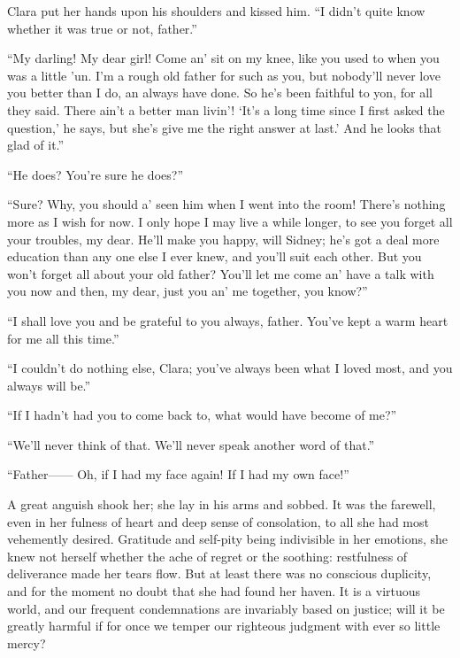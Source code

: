 Clara put her hands upon his shoulders and kissed him. ``I didn't quite
know whether it was true or not, father.''

``My darling! My dear girl! Come an' sit on my knee, like you used to
when you was a little 'un. I'm a rough old father for such as you, but
nobody'll never love you {}better than I do, an always have done. So
he's been faithful to yon, for all they said. There ain't a better man
livin'! `It's a long time since I first asked the question,' he says,
but she's give me the right answer at last.' And he looks that glad of
it.''

``He does? You're sure he does?''

``Sure? Why, you should a' seen him when I went into the room! There's
nothing more as I wish for now. I only hope I may live a while longer,
to see you forget all your troubles, my dear. He'll make you happy, will
Sidney; he's got a deal more education than any one else I ever knew,
and you'll suit each other. But you won't forget all about your old
father? You'll let me come an' have a talk with you now and then, my
dear, just you an' me together, you know?''

``I shall love you and be grateful to you always, father. You've kept a
warm heart for me all this time.''

``I couldn't do nothing else, Clara; you've always been what I loved
most, and you always will be.''

``If I hadn't had you to come back to, what would have become of me?''

{}``We'll never think of that. We'll never speak another word of that.''

``Father{{------}} Oh, if I had my face again! If I had my own face!''

A great anguish shook her; she lay in his arms and sobbed. It was the
farewell, even in her fulness of heart and deep sense of consolation, to
all she had most vehemently desired. Gratitude and self-pity being
indivisible in her emotions, she knew not herself whether the ache of
regret or the soothing: restfulness of deliverance made her tears flow.
But at least there was no conscious duplicity, and for the moment no
doubt that she had found her haven. It is a virtuous world, and our
frequent condemnations are invariably based on justice; will it be
greatly harmful if for once we temper our righteous judgment with ever
so little mercy?
